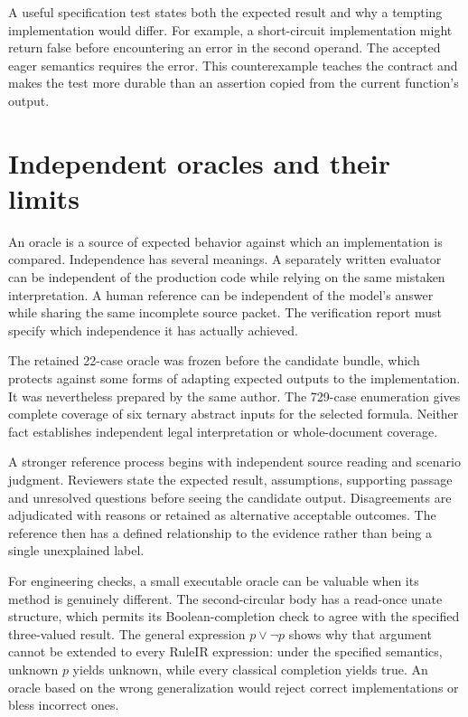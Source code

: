 A useful specification test states both the expected result and why a tempting
implementation would differ. For example, a short-circuit implementation might
return false before encountering an error in the second operand. The accepted
eager semantics requires the error. This counterexample teaches the contract and
makes the test more durable than an assertion copied from the current function's
output.

\section{Independent oracles and their limits}
\label{merge:M07:05}


An oracle is a source of expected behavior against which an implementation is
compared. Independence has several meanings. A separately written evaluator can
be independent of the production code while relying on the same mistaken
interpretation. A human reference can be independent of the model's answer while
sharing the same incomplete source packet. The verification report must specify
which independence it has actually achieved.

The retained 22-case oracle was frozen before the candidate bundle, which protects
against some forms of adapting expected outputs to the implementation. It was
nevertheless prepared by the same author. The 729-case enumeration gives complete
coverage of six ternary abstract inputs for the selected formula. Neither fact
establishes independent legal interpretation or whole-document coverage.

A stronger reference process begins with independent source reading and scenario
judgment. Reviewers state the expected result, assumptions, supporting passage
and unresolved questions before seeing the candidate output. Disagreements are
adjudicated with reasons or retained as alternative acceptable outcomes. The
reference then has a defined relationship to the evidence rather than being a
single unexplained label.


For engineering checks, a small executable oracle can be valuable when its method
is genuinely different. The second-circular body has a read-once unate structure,
which permits its Boolean-completion check to agree with the specified
three-valued result. The general expression $p\lor\neg p$ shows why that argument
cannot be extended to every RuleIR expression: under the specified semantics,
unknown $p$ yields unknown, while every classical completion yields true.
An oracle based on the wrong generalization would reject correct implementations
or bless incorrect ones.

